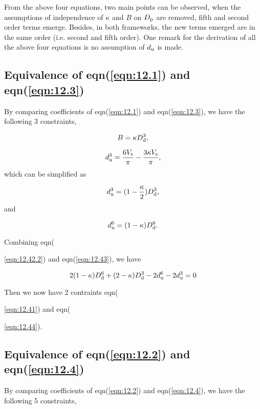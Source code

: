 \documentclass[12pt]{article}
\begin{document}
{From the above four equations, two main points can be observed, when the assumptions of independence of $\kappa$ and $B$ on $D_{\rm p}$ are removed, fifth and second order terms emerge. Besides, in both frameworks, 
the new terms emerged are in the same order (i.e. second and fifth order). One remark for the derivation of all the above four equations is no assumption of $d_{\rm u}$ is made.

\subsection{Equivalence of eqn(\ref{eqn:12.1}) and eqn(\ref{eqn:12.3})}

By comparing coefficients of eqn(\ref{eqn:12.1}) and eqn(\ref{eqn:12.3}), we have the following 3 constraints,

\begin{equation}\label{eqn:12.41}
B=\kappa D_{\rm d}^{3},
\end{equation}

\begin{equation}\label{eqn:12.42.1}
d_{\rm u}^{3}=\frac{6V_{\rm s}}{\pi} - \frac{3 \kappa V_{\rm s}}{\pi},
\end{equation}
which can be simplified as 

\begin{equation}\label{eqn:12.42.2}
d_{\rm u}^{3}=(1-\frac{\kappa}{2}) D_{\rm d}^{3} ,
\end{equation}
and 

\begin{equation}\label{eqn:12.43}
d_{\rm u}^{6}=(1-\kappa) D_{\rm d}^{6}.
\end{equation}

Combining eqn({\ref{eqn:12.42.2}) and eqn(\ref{eqn:12.43}), we have

\begin{equation}\label{eqn:12.44}
2(1-\kappa) D_{\rm d}^{6}+(2-\kappa)D_{\rm d}^{3}-2d_{\rm u}^{6}-2d_{\rm u}^{3}=0
\end{equation}

Then we now have 2 contraints eqn({\ref{eqn:12.41}) and eqn({\ref{eqn:12.44}).

\subsection{Equivalence of eqn(\ref{eqn:12.2}) and eqn(\ref{eqn:12.4})}

By comparing coefficients of eqn(\ref{eqn:12.2}) and eqn(\ref{eqn:12.4}), we have the following 5 constraints,

}}}}
\end{document}

